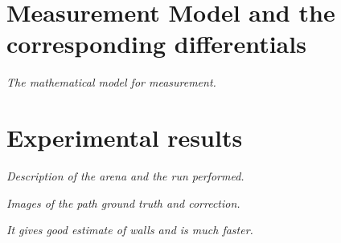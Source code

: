 


\section{Measurement Model and the corresponding differentials}
\textit{The mathematical model for measurement.}

\section{Experimental results}
\textit{Description of the arena and the run performed.}

\textit{Images of the path ground truth and correction.}

\textit{It gives good estimate of walls and is much faster.}
 